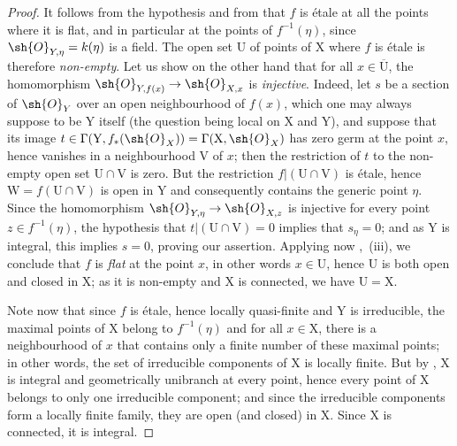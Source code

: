 \begin{proof}
It follows from the hypothesis and from  that $f$ is \'etale at all the points where it is flat, and in particular at the points of $f^{-1}(\eta)$, since $\sh{O}_{Y,\eta}=k(\eta)$ is a field.
The open set $\mathrm{U}$ of points of $\mathrm{X}$ where $f$ is \'etale is therefore \emph{non-empty}.
Let us show on the other hand that for all $x\in\overline{\mathrm{U}}$, the homomorphism $\sh{O}_{Y,f(x)}\to\sh{O}_{X,x}$ is \emph{injective}.
Indeed, let $s$ be a section of $\sh{O}_Y$ over an open neighbourhood of $f(x)$, which one may always suppose to be $\mathrm{Y}$ itself (the question being local on $\mathrm{X}$ and $\mathrm{Y}$), and suppose that its image $t\in\Gamma(\mathrm{Y},f_*(\sh{O}_X))=\Gamma(\mathrm{X},\sh{O}_X)$ has zero germ at the point $x$, hence vanishes in a neighbourhood $\mathrm{V}$ of $x$; then the restriction of $t$ to the non-empty open set $\mathrm{U}\cap\mathrm{V}$ is zero. But the restriction $f|(\mathrm{U}\cap\mathrm{V})$ is \'etale, hence $\mathrm{W}=f(\mathrm{U}\cap\mathrm{V})$ is open in $\mathrm{Y}$ and consequently contains the generic point $\eta$. Since the homomorphism $\sh{O}_{Y,\eta}\to\sh{O}_{X,z}$ is injective for every point $z\in f^{-1}(\eta)$, the hypothesis that $t|(\mathrm{U}\cap\mathrm{V})=0$ implies that $s_\eta=0$; and as $\mathrm{Y}$ is integral, this implies $s=0$, proving our assertion.
Applying now ,~(iii), we conclude that $f$ is \emph{flat} at the point $x$, in other words $x\in\mathrm{U}$, hence $\mathrm{U}$ is both open and closed in $\mathrm{X}$; as it is non-empty and $\mathrm{X}$ is connected, we have $\mathrm{U}=\mathrm{X}$.

Note now that since $f$ is \'etale, hence locally quasi-finite and $\mathrm{Y}$ is irreducible, the maximal points of $\mathrm{X}$ belong to $f^{-1}(\eta)$  and for all $x\in\mathrm{X}$, there is a neighbourhood of $x$ that contains only a finite number of these maximal points; in other words, the set of irreducible components of $\mathrm{X}$ is locally finite.
But by , $\mathrm{X}$ is integral and geometrically unibranch at every point, hence every point of $\mathrm{X}$ belongs to only one irreducible component; and since the irreducible components form a locally finite family, they are open (and closed) in $\mathrm{X}$. Since $\mathrm{X}$ is connected, it is integral.
\end{proof}

